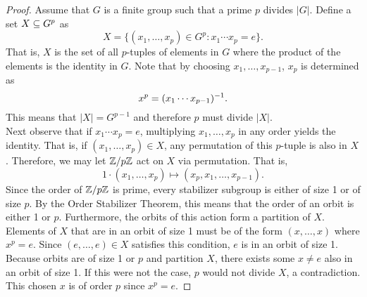 \documentclass[../AlgebraQualSolutions.tex]{subfiles}
\begin{document}
        \begin{proof}
        Assume that $G$ is a finite group such that a prime $p$ divides $|G|$. Define a set $X \subseteq G^p$ as
            \[X = \{(x_1, \ldots, x_p) \in G^p: x_1 \cdots x_p = e\}. \]
        That is, $X$ is the set of all $p$-tuples of elements in $G$ where the product of the elements is the identity in $G$. Note that by choosing $x_1, \ldots, x_{p-1}$, $x_p$ is determined as
            \[x^p = (x_1 \cdots x_{p - 1})^{-1}. \]
        This means that $|X| = G^{p-1}$ and therefore $p$ must divide $|X|$.\\
        
        Next observe that if $x_1 \cdots x_p = e$, multiplying $x_1, \ldots, x_p$ in any order yields the identity. That is, if $(x_1, \ldots, x_p) \in X$, any permutation of this $p$-tuple is also in $X$. Therefore, we may let $\mathbb{Z} / p\mathbb{Z}$ act on $X$ via permutation. That is,
            \[1 \cdot (x_1, \ldots, x_p) \mapsto (x_p, x_1, \ldots, x_{p-1}). \]
        Since the order of $\mathbb{Z} / p\mathbb{Z}$ is prime, every stabilizer subgroup is either of size 1 or of size $p$. By the Order Stabilizer Theorem, this means that the order of an orbit is either 1 or $p$. Furthermore, the orbits of this action form a partition of $X$. Elements of $X$ that are in an orbit of size 1 must be of the form $(x, \ldots, x)$ where $x^p = e$. Since $(e, \ldots, e) \in X$ satisfies this condition, $e$ is in an orbit of size 1. Because orbits are of size 1 or $p$ and partition $X$, there exists some $x \neq e$ also in an orbit of size 1. If this were not the case, $p$ would not divide $X$, a contradiction. This chosen $x$ is of order $p$ since $x^p = e$.
        \end{proof}
        
\end{document}
